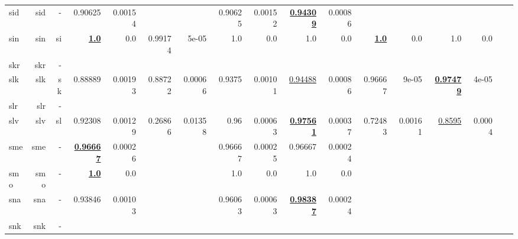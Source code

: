 \documentclass[11pt]{article}
\begin{document}
\begin{table*}[h]
{\begin{tabular}{lrrrrrrrrrrrrrrrr}
sid         & sid         & -         & 0.90625         & 0.00154         &          &          & 0.90625         & 0.00152         & \textbf{\underline{0.94309}}         & 0.00086         &          &          &          &          \\
sin         & sin         & si         & \textbf{\underline{1.0}}         & 0.0         & 0.99174         & 5e-05         & 1.0         & 0.0         & 1.0         & 0.0         & \textbf{\underline{1.0}}         & 0.0         & 1.0         & 0.0         \\
skr         & skr         & -         &          &          &          &          &          &          &          &          &          &          &          &          \\
slk         & slk         & sk         & 0.88889         & 0.00193         & 0.88722         & 0.00066         & 0.9375         & 0.00101         & \underline{0.94488}         & 0.00086         & 0.96667         & 9e-05         & \textbf{\underline{0.97479}}         & 4e-05         \\
slr         & slr         & -         &          &          &          &          &          &          &          &          &          &          &          &          \\
slv         & slv         & sl         & 0.92308         & 0.00129         & 0.26866         & 0.01358         & 0.96         & 0.00063         & \textbf{\underline{0.97561}}         & 0.00037         & 0.72483         & 0.00161         & \underline{0.8595}         & 0.0004         \\
sme         & sme         & -         & \textbf{\underline{0.96667}}         & 0.00026         &          &          & 0.96667         & 0.00025         & 0.96667         & 0.00024         &          &          &          &          \\
smo         & smo         & -         & \textbf{\underline{1.0}}         & 0.0         &          &          & 1.0         & 0.0         & 1.0         & 0.0         &          &          &          &          \\
sna         & sna         & -         & 0.93846         & 0.00103         &          &          & 0.96063         & 0.00063         & \textbf{\underline{0.98387}}         & 0.00024         &          &          &          &          \\
snk         & snk         & -         &          &          &          &          &          &          &          &          &          &          &          &          \\

\end{tabular}}
\end{table*}
\end{document}
